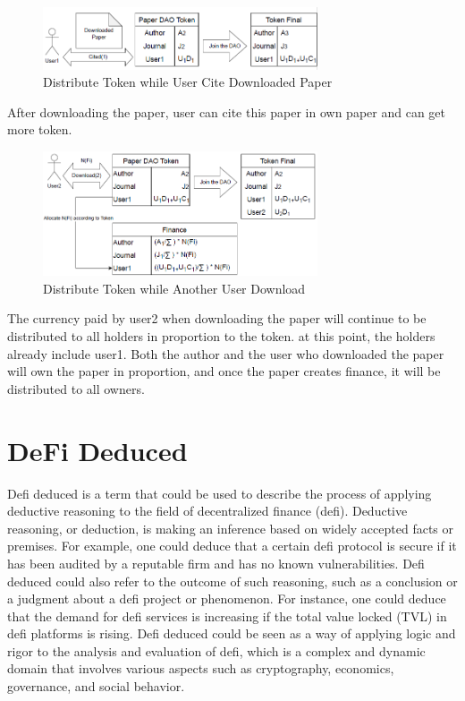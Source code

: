 \documentclass[lettersize,journal]{IEEEtran}
\begin{document}
\begin{figure}[h]
  \centering
  \includegraphics[width=3.2in]{assets/cite1.png}
  \caption{Distribute Token while User Cite Downloaded Paper}
\end{figure}


After downloading the paper, user can cite this paper in own paper and can get more token.


\begin{figure}[h]
  \centering
  \includegraphics[width=3.2in]{assets/donwload2.png}
  \caption{Distribute Token while Another User Download}
\end{figure}


The currency paid by user2 when downloading the paper will continue to be distributed to all holders in proportion to the token. at this point, the holders already include user1. Both the author and the user who downloaded the paper will own the paper in proportion, and once the paper creates finance, it will be distributed to all owners.

\section{DeFi Deduced}

Defi deduced is a term that could be used to describe the process of applying deductive reasoning to the field of decentralized finance (defi). Deductive reasoning, or deduction, is making an inference based on widely accepted facts or premises. For example, one could deduce that a certain defi protocol is secure if it has been audited by a reputable firm and has no known vulnerabilities. Defi deduced could also refer to the outcome of such reasoning, such as a conclusion or a judgment about a defi project or phenomenon. For instance, one could deduce that the demand for defi services is increasing if the total value locked (TVL) in defi platforms is rising. Defi deduced could be seen as a way of applying logic and rigor to the analysis and evaluation of defi, which is a complex and dynamic domain that involves various aspects such as cryptography, economics, governance, and social behavior.
\end{document}
